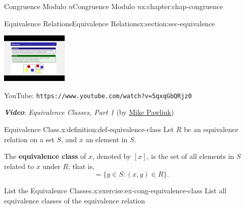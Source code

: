 \documentclass[oneside,10pt,]{book}
\newcommand{\mono}[1]{\texttt{#1}}
\newcommand{\alert}[1]{\textbf{\textit{#1}}}
\newcommand{\terminology}[1]{\textbf{#1}}
\numberwithin{equation}{section}
\newlength{\qrsize}
\newlength{\previewwidth}
\begin{document}
\begin{chapterptx}{Congruence Modulo \(n\)}{}{Congruence Modulo \(n\)}{}{}{x:chapter:chap-congruence}
\begin{sectionptx}{Equivalence Relations}{}{Equivalence Relations}{}{}{x:section:sec-equivalence}
\begin{sidebyside}{1}{0}{0}{0}
\begin{sbspanel}{1}
\begin{tcbraster}[raster columns=2, raster column skip=1pt, raster halign=center, raster force size=false, raster left skip=0pt, raster right skip=0pt]
\begin{tcolorbox}[previewstyle, width=\previewwidth]%
\includegraphics[width=0.80\linewidth,height=\qrsize,keepaspectratio]{images/video-equivalence-class-1.jpg}%
\end{tcolorbox}%
\begin{tcolorbox}[qrstyle]%
{\hypersetup{urlcolor=black}}%
\end{tcolorbox}%
\begin{tcolorbox}[captionstyle]%
\small YouTube: \mono{https://www.youtube.com/watch?v=5qxqGbQRjz0}\end{tcolorbox}%
\end{tcbraster}%
\end{sbspanel}%
\end{sidebyside}%
\par
\alert{Video}: \emph{Equivalence Classes, Part 1} (by \href{https://www.youtube.com/channel/UCnzqLoGhxAA46i9xcPHZavQ}{Mike Pawliuk})%
\begin{definition}{Equivalence Class.}{x:definition:def-equivalence-class}%
\label{g:notation:id532767}%
Let \(R\) be an equivalence relation on a set \(S\), and \(x\) an element in \(S\).%
\par
The \terminology{equivalence class} of \(x\), denoted by \([x]\), is the set of all elements in \(S\) related to \(x\) under \(R\); that is,%
\begin{equation*}
[x] = \{y \in S : (x,y) \in R\}\text{.}
\end{equation*}
%
\end{definition}
\begin{inlineexercise}{List the Equivalence Classes.}{x:exercise:ex-cong-equivalence-class}%
List all equivalence classes of the equivalence relation%

\end{inlineexercise}
\end{sectionptx}
\end{chapterptx}
\end{document}
